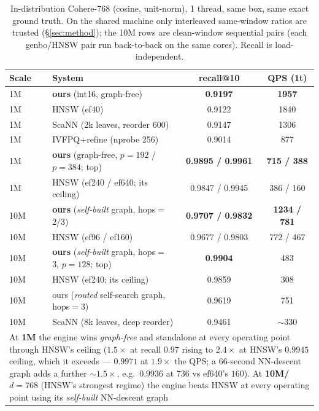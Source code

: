 \documentclass{article}
\begin{document}
\begin{table}[t]
\centering
\caption{In-distribution Cohere-768 (cosine, unit-norm), 1 thread, same box, same
exact ground truth. On the shared machine only interleaved same-window ratios are
trusted (\S\ref{sec:method}); the 10M rows are clean-window sequential pairs
(each genbo/HNSW pair run back-to-back on the same cores). Recall is load-independent.}
\label{tab:cohere}
\vspace{3pt}
\begin{tabular}{llcc}
\toprule
Scale & System & recall@10 & QPS (1t) \\
\midrule
1M  & \textbf{ours} (int16, graph-free)   & \textbf{0.9197} & \textbf{1957} \\
1M  & HNSW (ef40)                          & 0.9122 & 1840 \\
1M  & ScaNN (2k leaves, reorder 600)       & 0.9147 & 1306 \\
1M  & IVFPQ$+$refine (nprobe 256)          & 0.9014 & 877  \\
1M  & \textbf{ours} (graph-free, $p{=}192$ / $p{=}384$; top) & \textbf{0.9895 / 0.9961} & \textbf{715 / 388} \\
1M  & HNSW (ef240 / ef640; its ceiling)    & 0.9847 / 0.9945 & 386 / 160 \\
\midrule
10M & \textbf{ours} (\emph{self-built} graph, hops$=$2/3) & \textbf{0.9707 / 0.9832} & \textbf{1234 / 781} \\
10M & HNSW (ef96 / ef160)                               & 0.9677 / 0.9803 & 772 / 467 \\
10M & \textbf{ours} (\emph{self-built} graph, hops$=$3, $p{=}128$; top) & \textbf{0.9904} & 483 \\
10M & HNSW (ef240; its ceiling)                         & 0.9859 & 308 \\
10M & ours (\emph{routed} self-search graph, hops$=$3)  & 0.9619 & 751 \\
10M & ScaNN (8k leaves, deep reorder)                   & 0.9461 & ${\sim}330$ \\
\bottomrule
\multicolumn{4}{p{0.92\linewidth}}{\footnotesize At \textbf{1M} the engine wins
\emph{graph-free} and standalone at every operating point through HNSW's ceiling
($1.5{\times}$ at recall $0.97$ rising to $2.4{\times}$ at HNSW's $0.9945$ ceiling, which it
exceeds --- $0.9971$ at $1.9\times$ the QPS; a $66$-second NN-descent graph adds a further
${\sim}1.5\times$, e.g.\ $0.9936$ at $736$ vs ef640's $160$). At \textbf{10M/$d{=}768$} (HNSW's strongest regime) the
engine beats HNSW at every operating point using its \emph{self-built} NN-descent graph
}
\end{tabular}
\end{table}
\end{document}
